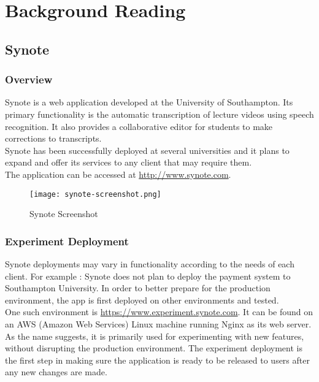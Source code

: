 \chapter{Background Reading}
\label{chap:background-reading}

\section{Synote}
\label{sec:synote}

\subsection{Overview}
\label{subsec:quick-overview}
Synote is a web application developed at the University of Southampton. Its primary functionality is the automatic transcription of lecture videos using speech recognition. It also provides a collaborative editor for students to make corrections to transcripts. \\

Synote has been successfully deployed at several universities and it plans to expand and offer its services to any client that may require them. \\

The application can be accessed at \url{http://www.synote.com}. \\

\begin{figure}[!hbt]
  \centering
 	\texttt{[image: synote-screenshot.png]}
  \caption{Synote Screenshot}
 	\label{fig:synote-screenshot}
\end{figure}

\subsection{Experiment Deployment}
\label{subsec:experiment-deployment}

Synote deployments may vary in functionality according to the needs of each client. For example : Synote does not plan to deploy the payment system to Southampton University. In order to better prepare for the production environment, the app is first deployed on other environments and tested. \\

One such environment is \url{https://www.experiment.synote.com}. It can be found on an AWS (Amazon Web Services) Linux machine running Nginx as its web server. As the name suggests, it is primarily used for experimenting with new features, without disrupting the production environment. The experiment deployment is the first step in making sure the application is ready to be released to users after any new changes are made. \\

